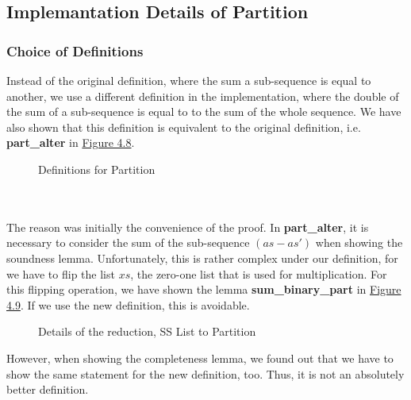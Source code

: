 \subsection{Implemantation Details of Partition}
\subsubsection{Choice of Definitions}
Instead of the original definition, where the sum a sub-sequence is equal to another, we use a different definition in the implementation,
where the double of the sum of a sub-sequence is equal to to the sum of the whole sequence. We have also shown that this definition is equivalent 
to the original definition, i.e. \textbf{part\_alter} in \hyperref[fig:4.8]{Figure 4.8}. 
\begin{figure}[!h]
    \caption{Definitions for Partition}
    \label{fig:4.8}
\end{figure}\\\\
The reason was initially the convenience of the proof. 
In \textbf{part\_alter}, it is necessary to consider the sum of the sub-sequence $(as - as')$ when showing the soundness lemma. 
Unfortunately, this is rather complex under our definition, for we have to flip the list $xs$, the zero-one list that is used for multiplication. For this 
flipping operation, we have shown the lemma \textbf{sum\_binary\_part} in \hyperref[fig:4.9]{Figure 4.9}. If we use the new definition, this is avoidable.
\begin{figure}[!h]
    \caption{Details of the reduction, SS List to Partition}
    \label{fig:4.9}
\end{figure}
However, when showing the completeness lemma, we found out that we have to show the same statement for the new definition, too. 
Thus, it is not an absolutely better definition. 
